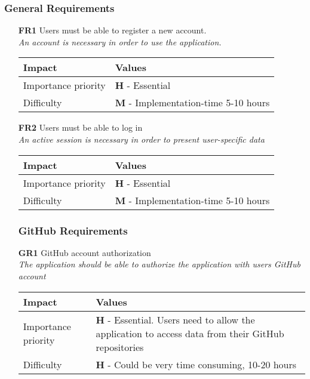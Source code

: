 \subsubsection{General Requirements}
\begin{itemize}
    \vspace{0.5cm}
	\item[\textbf{FR1}] Users must be able to register a new account. \\
        \textit{\small{An account is necessary in order to use the application. }}

        \begin{tabular}{| l | p{7cm} |}
            \hline
            \rowcolor[gray]{0.8}
            \textbf{Impact} & \textbf{Values} \\
            \hline
            Importance priority & \textbf{H} - Essential \\
            Difficulty & \textbf{M} - Implementation-time 5-10 hours\\
            \hline
        \end{tabular}
    \vspace{0.5cm}
    \item[\textbf{FR2}] Users must be able to log in \\
        \textit{\small{An active session is necessary in order to present user-specific data}}

        \begin{tabular}{| l | p{7cm} |}
            \hline
            \rowcolor[gray]{0.8}
            \textbf{Impact} & \textbf{Values} \\
            \hline
            Importance priority & \textbf{H} - Essential \\
            Difficulty & \textbf{M} - Implementation-time 5-10 hours \\
            \hline
        \end{tabular}
    \vspace{0.5cm}

    \subsubsection{GitHub Requirements}
    \item[\textbf{GR1}] GitHub account authorization\\
        \textit{\small{The application should be able to authorize the application with users GitHub account}}

        \begin{tabular}{| l | p{7cm} |}
            \hline
            \rowcolor[gray]{0.8}
            \textbf{Impact} & \textbf{Values} \\
            \hline
            Importance priority & \textbf{H} - Essential. Users need to allow the application to access data from their GitHub repositories\\
            Difficulty & \textbf{H} - Could be very time consuming, 10-20 hours \\
            \hline
        \end{tabular}
    \vspace{0.5cm}


\end{itemize}
